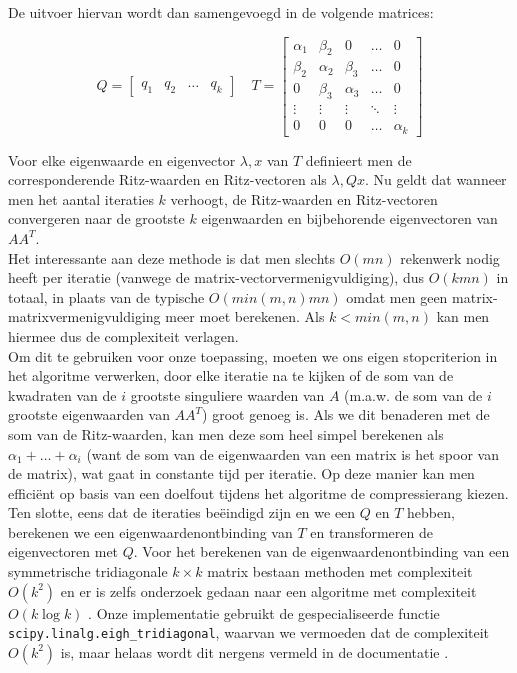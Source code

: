 De uitvoer hiervan wordt dan samengevoegd in de volgende matrices:

\[
Q = 
\begin{bmatrix}
q_1 & q_2 & \dots & q_k
\end{bmatrix}
\quad
T = \begin{bmatrix}
\alpha_1 & \beta_2 & 0 & \dots & 0 \\
\beta_2 & \alpha_2 & \beta_3 & \dots & 0 \\
0 & \beta_3 & \alpha_3 & \dots & 0 \\
\vdots & \vdots & \vdots & \ddots & \vdots \\
0 & 0 & 0 & \dots & \alpha_k
\end{bmatrix}
\]
\newpage

Voor elke eigenwaarde en eigenvector $\lambda, x$ van $T$ definieert men de corresponderende Ritz-waarden en Ritz-vectoren als $\lambda, Qx$. Nu geldt dat wanneer men het aantal iteraties $k$ verhoogt, de Ritz-waarden en Ritz-vectoren convergeren naar de grootste $k$ eigenwaarden en bijbehorende eigenvectoren van $A A^T$.\\

Het interessante aan deze methode is dat men slechts $O(mn)$ rekenwerk nodig heeft per iteratie (vanwege de matrix-vectorvermenigvuldiging), dus $O(kmn)$ in totaal, in plaats van de typische $O(min(m, n)mn)$ omdat men geen matrix-matrixvermenigvuldiging meer moet berekenen. Als $k < min(m, n)$ kan men hiermee dus de complexiteit verlagen.\\

Om dit te gebruiken voor onze toepassing, moeten we ons eigen stopcriterion in het algoritme verwerken, door elke iteratie na te kijken of de som van de kwadraten van de $i$ grootste singuliere waarden van $A$ (m.a.w. de som van de $i$ grootste eigenwaarden van $A A^T$) groot genoeg is. Als we dit benaderen met de som van de Ritz-waarden, kan men deze som heel simpel berekenen als $\alpha_1 + \dots + \alpha_i$ (want de som van de eigenwaarden van een matrix is het spoor van de matrix), wat gaat in constante tijd per iteratie. Op deze manier kan men effici\"ent op basis van een doelfout tijdens het algoritme de compressierang kiezen.\\

Ten slotte, eens dat de iteraties be\"eindigd zijn en we een $Q$ en $T$ hebben, berekenen we een eigenwaardenontbinding van $T$ en transformeren de eigenvectoren met $Q$. Voor het berekenen van de eigenwaardenontbinding van een symmetrische tridiagonale $k \times k$ matrix bestaan methoden met complexiteit $O(k^2)$ en er is zelfs onderzoek gedaan naar een algoritme met complexiteit $O(k \log{k})$ \cite{ref:coakley}. Onze implementatie gebruikt de gespecialiseerde functie \texttt{scipy.linalg.eigh\_tridiagonal}, waarvan we vermoeden dat de complexiteit $O(k^2)$ is, maar helaas wordt dit nergens vermeld in de documentatie \cite{ref:eigh_tridiagonal}.

